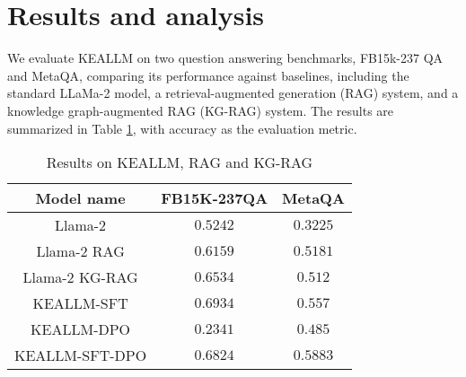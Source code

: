 \section{Results and analysis}
We evaluate KEALLM on two question answering benchmarks, FB15k-237 QA and MetaQA, comparing its performance against baselines, including the standard LLaMa-2 model, a retrieval-augmented generation (RAG) system, and a knowledge graph-augmented RAG (KG-RAG) system. The results are summarized in Table \ref{tab:rag}, with accuracy as the evaluation metric.
\begin{table}[hbt]
    \centering
    \caption{Results on KEALLM, RAG and KG-RAG}
    \begin{tabular}{|c|c|c|}
        \hline
         \textbf{Model name} &  \textbf{FB15K-237QA} & \textbf{MetaQA}\\
         \hline
         Llama-2 &  $0.5242$ & $0.3225$\\
         \hline
         Llama-2 RAG & $0.6159$ &  $0.5181$ \\
         \hline
         Llama-2 KG-RAG&  $0.6534$ &  $0.512$\\
         \hline
         KEALLM-SFT &  $\mathbf{0.6934}$ &  $0.557$\\
         \hline
         KEALLM-DPO &  $0.2341$ &  $0.485$\\
         \hline
         KEALLM-SFT-DPO &  $0.6824$ &  $\mathbf{0.5883}$\\
         \hline
    \end{tabular}
    
    \label{tab:rag}
\end{table}

